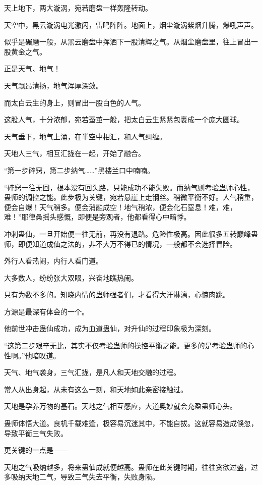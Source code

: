 \begin{this_body}
天上地下，两大漩涡，宛若磨盘一样轰隆转动。

天空中，黑云漩涡电光激闪，雷鸣阵阵。地面上，烟尘漩涡紫烟升腾，爆吼声声。

似乎是碾磨一般，从黑云磨盘中挥洒下一股清辉之气。从烟尘磨盘里，往上冒出一股黄金之气。

正是天气、地气！

天气飘昂清扬，地气浑厚深敛。

而太白云生的身上，则冒出一股白色的人气。

这股人气，十分浓郁，宛若蚕茧一般，把太白云生紧紧包裹成一个庞大圆球。

天气垂下，地气上涌，在半空中相汇，和人气纠缠。

天地人三气，相互汇拢在一起，开始了融合。

“第一步碎窍，第二步纳气……”黑楼兰口中喃喃。

“碎窍一往无回，根本没有回头路，只能成功不能失败。而纳气则考验蛊师心性，蛊师的调控之能。此步极为关键，宛若悬崖上走钢丝。稍微平衡不好。人气稍重，便会自爆！天气稍多。便会消融成空！地气稍浓，便会化石窒息！难，难，难！”耶律桑摇头感慨，即便是旁观者，他都看得心中暗悸。

冲刺蛊仙，一旦开始便一往无前，再没有退路。危险性极高。因此很多五转巅峰蛊师，即便知道成仙之法的，非不大万不得已的情况，一般都不会选择冒险。

外行人看热闹，内行人看门道。

大多数人，纷纷张大双眼，兴奋地瞧热闹。

只有为数不多的。知晓内情的蛊师强者们，才看得大汗淋漓，心惊肉跳。

方源是最深有体会的一个。

他前世冲击蛊仙成功，成为血道蛊仙，对升仙的过程印象极为深刻。

“这第二步艰辛无比，其实不仅考验蛊师的操控平衡之能。更多的是考验蛊师的心性啊。”他暗叹道。

天气、地气袭身，三气汇拢，是凡人和天地交融的过程。

常人从出身起，从未有这么一刻，和天地如此亲密接触过。

天地是孕养万物的基石。天地之气相互感应，大道奥妙就会充盈蛊师心头。

蛊师体悟大道。良机千载难逢，极容易沉迷其中，不能自拔。这就容易造成倏忽，导致平衡三气失败。

更关键的一点是——

天地之气吸纳越多，将来蛊仙成就便越高。蛊师在此关键时期，往往贪欲过盛，过多吸纳天地二气，导致三气失去平衡，失败身陨。


\end{this_body}
